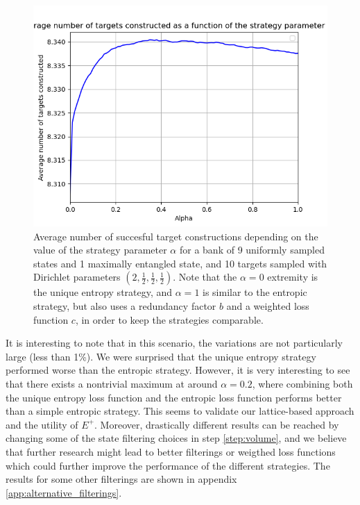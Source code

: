 \begin{figure}[h!]
    \centering
    \includegraphics[scale=0.7]{images/locc_game_100000_4_10_1_0.01_2.png}
    \caption{Average number of succesful target constructions depending on the value of the strategy parameter $\alpha$ for a bank of 9 uniformly sampled states and 1 maximally entangled state, and 10 targets sampled with Dirichlet parameters $\left(2, \frac{1}{2}, \frac{1}{2}, \frac{1}{2}\right)$. Note that the $\alpha = 0$ extremity is the unique entropy strategy, and $\alpha = 1$ is similar to the entropic strategy, but also uses a redundancy factor $b$ and a weighted loss function $c$, in order to keep the strategies comparable.}
    \label{fig:strategy_comparison}
\end{figure}

It is interesting to note that in this scenario, the variations are not particularly large (less than 1\%). We were surprised that the unique entropy strategy performed worse than the entropic strategy. However, it is very interesting to see that there exists a nontrivial maximum at around $\alpha = 0.2$, where combining both the unique entropy loss function and the entropic loss function performs better than a simple entropic strategy. This seems to validate our lattice-based approach and the utility of $E^+$. Moreover, drastically different results can be reached by changing some of the state filtering choices in step \ref{step:volume}, and we believe that further research might lead to better filterings or weigthed loss functions which could further improve the performance of the different strategies. The results for some other filterings are shown in appendix \ref{app:alternative_filterings}.



